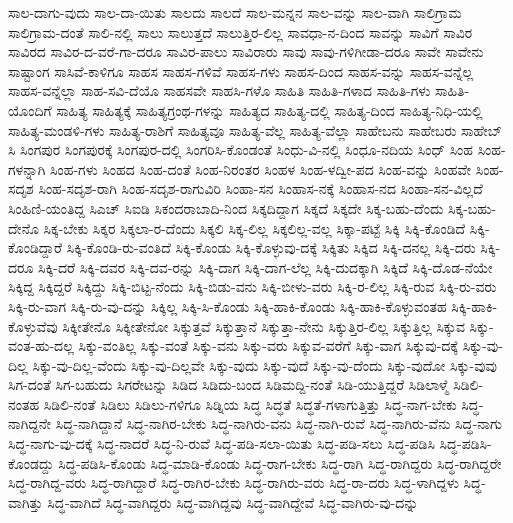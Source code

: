 {ಸಾಲ-ದಾಗು-ವುದು
ಸಾಲ-ದಾ-ಯಿತು
ಸಾಲದು
ಸಾಲದೆ
ಸಾಲ-ಮನ್ನನ
ಸಾಲ-ವನ್ನು
ಸಾಲ-ವಾಗಿ
ಸಾಲಿಗ್ರಾಮ
ಸಾಲಿಗ್ರಾಮ-ದಂತೆ
ಸಾಲಿ-ನಲ್ಲಿ
ಸಾಲು
ಸಾಲುತ್ತದೆ
ಸಾಲುತ್ತಿರ-ಲಿಲ್ಲ
ಸಾವಧಾ-ನ-ದಿಂದ
ಸಾವನ್ನು
ಸಾವಿಗೆ
ಸಾವಿರ
ಸಾವಿರದ
ಸಾವಿರ-ದ-ವರೆ-ಗಾ-ದರೂ
ಸಾವಿರ-ಪಾಲು
ಸಾವಿರಾರು
ಸಾವು
ಸಾವು-ಗಳಿಗೀಡಾ-ದರೂ
ಸಾವೇ
ಸಾವೇನು
ಸಾಷ್ಟಾಂಗ
ಸಾಸಿವೆ-ಕಾಳಿಗೂ
ಸಾಹಸ
ಸಾಹಸ-ಗಳಿವೆ
ಸಾಹಸ-ಗಳು
ಸಾಹಸ-ದಿಂದ
ಸಾಹಸ-ವನ್ನು
ಸಾಹಸ-ವನ್ನೆಲ್ಲ
ಸಾಹಸ-ವನ್ನೆಲ್ಲಾ
ಸಾಹ-ಸವಿ-ದೆಯೊ
ಸಾಹಸವೇ
ಸಾಹಸಿ-ಗಳೊ
ಸಾಹಿತಿ
ಸಾಹಿತಿ-ಗಳಾದ
ಸಾಹಿತಿ-ಗಳು
ಸಾಹಿತಿ-ಯೊಂದಿಗೆ
ಸಾಹಿತ್ಯ
ಸಾಹಿತ್ಯಕ್ಕೆ
ಸಾಹಿತ್ಯಗ್ರಂಥ-ಗಳನ್ನು
ಸಾಹಿತ್ಯದ
ಸಾಹಿತ್ಯ-ದಲ್ಲಿ
ಸಾಹಿತ್ಯ-ದಿಂದ
ಸಾಹಿತ್ಯ-ನಿಧಿ-ಯಲ್ಲಿ
ಸಾಹಿತ್ಯ-ಮಂಡಳಿ-ಗಳು
ಸಾಹಿತ್ಯ-ರಾಶಿಗೆ
ಸಾಹಿತ್ಯವೂ
ಸಾಹಿತ್ಯ-ವೆಲ್ಲ
ಸಾಹಿತ್ಯ-ವೆಲ್ಲಾ
ಸಾಹೇಬನು
ಸಾಹೇಬರು
ಸಾಹೇಬ್
ಸಿ
ಸಿಂಗಪುರ
ಸಿಂಗಪುರಕ್ಕೆ
ಸಿಂಗಪುರ-ದಲ್ಲಿ
ಸಿಂಗರಿಸಿ-ಕೊಂಡಂತೆ
ಸಿಂಧು-ವಿ-ನಲ್ಲಿ
ಸಿಂಧೂ-ನದಿಯ
ಸಿಂಧ್
ಸಿಂಹ
ಸಿಂಹ-ಗಳನ್ನಾಗಿ
ಸಿಂಹ-ಗಳು
ಸಿಂಹದ
ಸಿಂಹ-ದಂತೆ
ಸಿಂಹ-ನಿರಂತರ
ಸಿಂಹಳ
ಸಿಂಹ-ಳದ್ವೀ-ಪದ
ಸಿಂಹ-ವನ್ನು
ಸಿಂಹವೇ
ಸಿಂಹ-ಸದೃಶ
ಸಿಂಹ-ಸದೃಶ-ರಾಗಿ
ಸಿಂಹ-ಸದೃಶ-ರಾಗುವಿರಿ
ಸಿಂಹಾ-ಸನ
ಸಿಂಹಾಸ-ನಕ್ಕೆ
ಸಿಂಹಾಸ-ನದ
ಸಿಂಹಾ-ಸನ-ವಿಲ್ಲದೆ
ಸಿಂಹಿಣಿ-ಯಂತಿದ್ದ
ಸಿಎಚ್
ಸಿಐಡಿ
ಸಿಕಂದರಾಬಾದಿ-ನಿಂದ
ಸಿಕ್ಕದಿದ್ದಾಗ
ಸಿಕ್ಕದೆ
ಸಿಕ್ಕದೇ
ಸಿಕ್ಕ-ಬಹು-ದೆಂದು
ಸಿಕ್ಕ-ಬಹು-ದೇನೊ
ಸಿಕ್ಕ-ಬೇಕು
ಸಿಕ್ಕರ
ಸಿಕ್ಕಲಾ-ರ-ದೆಂದು
ಸಿಕ್ಕಲಿ
ಸಿಕ್ಕ-ಲಿಲ್ಲ
ಸಿಕ್ಕಲಿಲ್ಲ-ವಲ್ಲ
ಸಿಕ್ಕಾ-ಪಟ್ಟೆ
ಸಿಕ್ಕಿ
ಸಿಕ್ಕಿ-ಕೊಂಡಿದೆ
ಸಿಕ್ಕಿ-ಕೊಂಡಿದ್ದಾರೆ
ಸಿಕ್ಕಿ-ಕೊಂಡಿ-ರು-ವಂತಿದೆ
ಸಿಕ್ಕಿ-ಕೊಂಡು
ಸಿಕ್ಕಿ-ಕೊಳ್ಳುವು-ದಕ್ಕೆ
ಸಿಕ್ಕಿತು
ಸಿಕ್ಕಿದ
ಸಿಕ್ಕಿ-ದನಲ್ಲ
ಸಿಕ್ಕಿ-ದರು
ಸಿಕ್ಕಿ-ದರೂ
ಸಿಕ್ಕಿ-ದರೆ
ಸಿಕ್ಕಿ-ದವರ
ಸಿಕ್ಕಿ-ದವ-ರನ್ನು
ಸಿಕ್ಕಿ-ದಾಗ
ಸಿಕ್ಕಿ-ದಾಗ-ಲೆಲ್ಲ
ಸಿಕ್ಕಿ-ದುದಕ್ಕಾಗಿ
ಸಿಕ್ಕಿದೆ
ಸಿಕ್ಕಿ-ದೊಡ-ನೆಯೇ
ಸಿಕ್ಕಿದ್ದ
ಸಿಕ್ಕಿದ್ದರೆ
ಸಿಕ್ಕಿದ್ದು
ಸಿಕ್ಕಿ-ಬಿಟ್ಟ-ನೆಂದು
ಸಿಕ್ಕಿ-ಬಿಡು-ವನು
ಸಿಕ್ಕಿ-ಬೀಳು-ವರು
ಸಿಕ್ಕಿ-ರ-ಲಿಲ್ಲ
ಸಿಕ್ಕಿ-ರುವ
ಸಿಕ್ಕಿ-ರು-ವರು
ಸಿಕ್ಕಿ-ರು-ವಾಗ
ಸಿಕ್ಕಿ-ರು-ವು-ದನ್ನು
ಸಿಕ್ಕಿಲ್ಲ
ಸಿಕ್ಕಿ-ಸಿ-ಕೊಂಡು
ಸಿಕ್ಕಿ-ಹಾಕಿ-ಕೊಂಡು
ಸಿಕ್ಕಿ-ಹಾಕಿ-ಕೊಳ್ಳುವಂತಹ
ಸಿಕ್ಕಿ-ಹಾಕಿ-ಕೊಳ್ಳುವೆವು
ಸಿಕ್ಕೀತೇನೊ
ಸಿಕ್ಕೀತೇನೋ
ಸಿಕ್ಕುತ್ತವೆ
ಸಿಕ್ಕುತ್ತಾನೆ
ಸಿಕ್ಕುತ್ತಾ-ನೇನು
ಸಿಕ್ಕುತ್ತಿರ-ಲಿಲ್ಲ
ಸಿಕ್ಕುತ್ತಿಲ್ಲ
ಸಿಕ್ಕುವ
ಸಿಕ್ಕು-ವಂತ-ಹು-ದಲ್ಲ
ಸಿಕ್ಕು-ವಂತಿಲ್ಲ
ಸಿಕ್ಕು-ವಂತೆ
ಸಿಕ್ಕು-ವನು
ಸಿಕ್ಕು-ವರು
ಸಿಕ್ಕುವ-ವರೆಗೆ
ಸಿಕ್ಕು-ವಾಗ
ಸಿಕ್ಕುವು-ದಕ್ಕೆ
ಸಿಕ್ಕು-ವು-ದಿಲ್ಲ
ಸಿಕ್ಕು-ವು-ದಿಲ್ಲ-ವೆಂದು
ಸಿಕ್ಕು-ವು-ದಿಲ್ಲವೇ
ಸಿಕ್ಕು-ವುದು
ಸಿಕ್ಕು-ವುದೆ
ಸಿಕ್ಕು-ವು-ದೆಂದು
ಸಿಕ್ಕು-ವುದೋ
ಸಿಕ್ಕು-ವುವು
ಸಿಗ-ದಂತೆ
ಸಿಗ-ಬಹುದು
ಸಿಗರೇಟನ್ನು
ಸಿಡಿದ
ಸಿಡಿದು-ಬಂದ
ಸಿಡಿಮದ್ದಿ-ನಂತೆ
ಸಿಡಿ-ಯುತ್ತಿದ್ದರೆ
ಸಿಡಿಲಾಳ್ಮೆ
ಸಿಡಿಲಿ-ನಂತಹ
ಸಿಡಿಲಿ-ನಂತೆ
ಸಿಡಿಲು
ಸಿಡಿಲು-ಗಳಿಗೂ
ಸಿಡ್ನಿಯ
ಸಿದ್ಧ
ಸಿದ್ಧತೆ
ಸಿದ್ಧತೆ-ಗಳಾಗುತ್ತಿತ್ತು
ಸಿದ್ಧ-ನಾಗ-ಬೇಕು
ಸಿದ್ಧ-ನಾಗಿದ್ದನೇ
ಸಿದ್ಧ-ನಾಗಿದ್ದಾನೆ
ಸಿದ್ಧ-ನಾಗಿರ-ಬೇಕು
ಸಿದ್ಧ-ನಾಗಿರು-ವನು
ಸಿದ್ಧ-ನಾಗಿ-ರುವೆ
ಸಿದ್ಧ-ನಾಗಿರು-ವೆನು
ಸಿದ್ಧ-ನಾಗು
ಸಿದ್ಧ-ನಾಗು-ವು-ದಕ್ಕೆ
ಸಿದ್ಧ-ನಾದರೆ
ಸಿದ್ಧ-ನಿ-ರುವೆ
ಸಿದ್ಧ-ಪಡಿ-ಸಲಾ-ಯಿತು
ಸಿದ್ಧ-ಪಡಿ-ಸಲು
ಸಿದ್ಧ-ಪಡಿಸಿ
ಸಿದ್ಧ-ಪಡಿಸಿ-ಕೊಂಡದ್ದು
ಸಿದ್ಧ-ಪಡಿಸಿ-ಕೊಂಡು
ಸಿದ್ಧ-ಮಾಡಿ-ಕೊಂಡು
ಸಿದ್ಧ-ರಾಗ-ಬೇಕು
ಸಿದ್ಧ-ರಾಗಿ
ಸಿದ್ಧ-ರಾಗಿದ್ದರು
ಸಿದ್ಧ-ರಾಗಿದ್ದರೇ
ಸಿದ್ಧ-ರಾಗಿದ್ದ-ವರು
ಸಿದ್ಧ-ರಾಗಿದ್ದಾರೆ
ಸಿದ್ಧ-ರಾಗಿರ-ಬೇಕು
ಸಿದ್ಧ-ರಾಗಿರು-ವರು
ಸಿದ್ಧ-ರಾ-ದರು
ಸಿದ್ಧ-ಳಾಗಿದ್ದಳು
ಸಿದ್ಧ-ವಾಗಿತ್ತು
ಸಿದ್ಧ-ವಾಗಿದೆ
ಸಿದ್ಧ-ವಾಗಿದ್ದರು
ಸಿದ್ಧ-ವಾಗಿದ್ದವು
ಸಿದ್ಧ-ವಾಗಿದ್ದೇವೆ
ಸಿದ್ಧ-ವಾಗಿರು-ವು-ದನ್ನು
}
